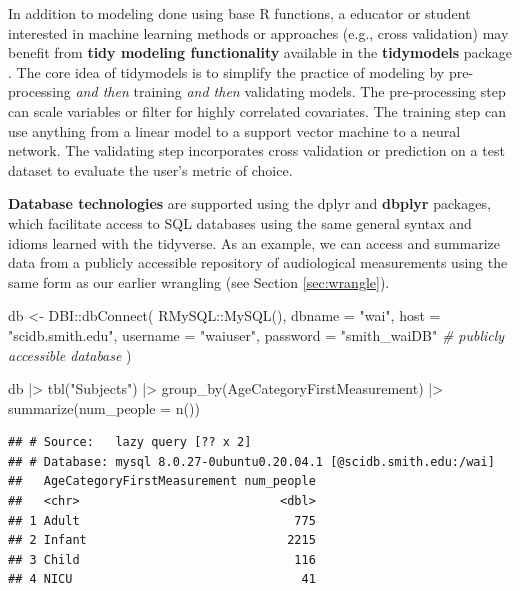 \documentclass[12pt]{article}
\newenvironment{Shaded}{\begin{snugshade}}{\end{snugshade}}
\newcommand{\AttributeTok}[1]{\textcolor[rgb]{0.77,0.63,0.00}{#1}}
\newcommand{\CommentTok}[1]{\textcolor[rgb]{0.56,0.35,0.01}{\textit{#1}}}
\newcommand{\FunctionTok}[1]{\textcolor[rgb]{0.00,0.00,0.00}{#1}}
\newcommand{\NormalTok}[1]{#1}
\newcommand{\OtherTok}[1]{\textcolor[rgb]{0.56,0.35,0.01}{#1}}
\newcommand{\SpecialCharTok}[1]{\textcolor[rgb]{0.00,0.00,0.00}{#1}}
\newcommand{\StringTok}[1]{\textcolor[rgb]{0.31,0.60,0.02}{#1}}
\begin{document}
In addition to modeling done using base R functions, a educator or
student interested in machine learning methods or approaches (e.g.,
cross validation) may benefit from \textbf{tidy modeling functionality}
available in the \textbf{tidymodels} package \citep{R-tidymodels}. The
core idea of tidymodels is to simplify the practice of modeling by
pre-processing \emph{and then} training \emph{and then} validating
models. The pre-processing step can scale variables or filter for highly
correlated covariates. The training step can use anything from a linear
model to a support vector machine to a neural network. The validating
step incorporates cross validation or prediction on a test dataset to
evaluate the user's metric of choice.

\textbf{Database technologies} are supported using the dplyr
\citep{R-dplyr} and \textbf{dbplyr} \citep{R-dbplyr} packages, which
facilitate access to SQL databases using the same general syntax and
idioms learned with the tidyverse. As an example, we can access and
summarize data from a publicly accessible repository of audiological
measurements \citep{voss_2019} using the same form as our earlier
wrangling (see Section \ref{sec:wrangle}).

\linespread{1}

\begin{Shaded}
\begin{Highlighting}[]
\NormalTok{db }\OtherTok{\textless{}{-}}\NormalTok{ DBI}\SpecialCharTok{::}\FunctionTok{dbConnect}\NormalTok{(}
\NormalTok{  RMySQL}\SpecialCharTok{::}\FunctionTok{MySQL}\NormalTok{(),}
  \AttributeTok{dbname =} \StringTok{"wai"}\NormalTok{, }
  \AttributeTok{host =} \StringTok{"scidb.smith.edu"}\NormalTok{, }
  \AttributeTok{username =} \StringTok{"waiuser"}\NormalTok{, }
  \AttributeTok{password =} \StringTok{"smith\_waiDB"}  \CommentTok{\# publicly accessible database}
\NormalTok{)}

\NormalTok{db }\SpecialCharTok{|\textgreater{}}
  \FunctionTok{tbl}\NormalTok{(}\StringTok{"Subjects"}\NormalTok{) }\SpecialCharTok{|\textgreater{}} 
  \FunctionTok{group\_by}\NormalTok{(AgeCategoryFirstMeasurement) }\SpecialCharTok{|\textgreater{}}
  \FunctionTok{summarize}\NormalTok{(}\AttributeTok{num\_people =} \FunctionTok{n}\NormalTok{())}
\end{Highlighting}
\end{Shaded}

\begin{verbatim}
## # Source:   lazy query [?? x 2]
## # Database: mysql 8.0.27-0ubuntu0.20.04.1 [@scidb.smith.edu:/wai]
##   AgeCategoryFirstMeasurement num_people
##   <chr>                            <dbl>
## 1 Adult                              775
## 2 Infant                            2215
## 3 Child                              116
## 4 NICU                                41
\end{verbatim}
\end{document}
